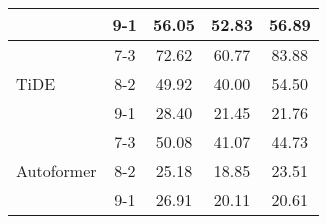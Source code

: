 \begin{table}[h!]
\begin{tabular}{|l|c|c|c|c|}
    \rowcolor{white}  & 9-1 & 56.05 & 52.83 & 56.89 \\ \hline
    \rowcolor{white!30} & 7-3 & 72.62 & 60.77 & 83.88 \\ 
    \rowcolor{white!30} TiDE & 8-2 & 49.92 & 40.00 & 54.50 \\ 
    \rowcolor{white!30} & 9-1 & 28.40 & 21.45 & 21.76 \\ \hline
    \rowcolor{white}  & 7-3 & 50.08 & 41.07 & 44.73 \\ 
    \rowcolor{white} Autoformer & 8-2 & 25.18 & 18.85 & 23.51 \\ 
    \rowcolor{white}  & 9-1 & 26.91 & 20.11 & 20.61 \\ \hline

    \end{tabular}
\end{table}